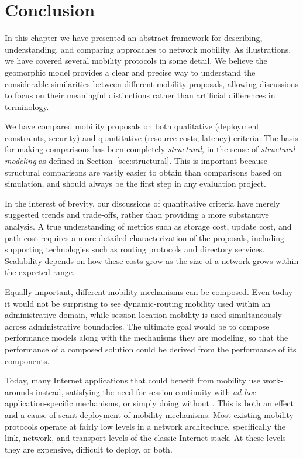 \section{Conclusion}
\label{sec:sec9}

In this chapter we have presented an abstract framework for describing, 
understanding, and comparing approaches to network mobility.  
As illustrations, we have covered several mobility protocols 
in some detail.
We believe the geomorphic model provides a clear and precise way to understand the considerable similarities between different mobility proposals,
allowing discussions to focus on their meaningful distinctions rather than artificial differences in terminology.

We have compared mobility proposals on both qualitative
(deployment constraints, security) and quantitative (resource costs,
latency) criteria.
The basis for making comparisons has been completely {\it structural},
in the sense of {\it structural modeling} as defined in 
Section~\ref{sec:structural}.
This is important because structural comparisons are vastly easier
to obtain than comparisons based on simulation, and should always
be the first step in any evaluation project.

In the interest of brevity, our discussions of quantitative
criteria have merely suggested trends and trade-offs, rather than
providing a more substantive analysis.
A true understanding of metrics such as
storage cost, update cost, and path cost requires a more 
detailed characterization of the proposals, including
supporting technologies such as routing protocols and directory services. 
Scalability depends on how these costs grow as the size of a network
grows within the expected range.
 
Equally important, different mobility mechanisms can be composed.
Even today it would not be surprising to see
dynamic-routing mobility used 
within an administrative domain, while
session-location mobility is used simultaneously
across administrative boundaries.
The ultimate goal would be to compose performance models along with
the mechanisms they are modeling, so that the performance of
a composed solution could be derived from the performance of its
components.   

Today, many Internet applications that could benefit from mobility
use work-arounds instead, satisfying the need for session continuity
with {\it ad hoc} application-specific mechanisms, or simply doing
without \cite{handley}.
This is both an effect and a cause of scant deployment of mobility
mechanisms.
Most existing mobility protocols operate at fairly low levels
in a network architecture, 
specifically the link, network, and transport levels
of the classic Internet stack.
At these levels they are expensive, difficult to deploy, or both.

